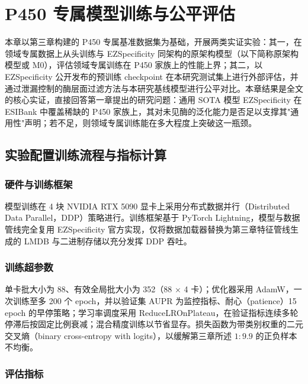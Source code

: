 
\chapter{P450 专属模型训练与公平评估}
\label{cha:training}

本章以第三章构建的 P450 专属基准数据集为基础，开展两类实证实验：其一，在领域专属数据上从头训练与 EZSpecificity 同架构的原架构模型（以下简称原架构模型或 M0），评估领域专属训练在 P450 家族上的性能上界；其二，以 EZSpecificity 公开发布的预训练 checkpoint 在本研究测试集上进行外部评估，并通过泄漏控制的酶层面过滤方法与本研究基线模型进行公平对比。本章结果是全文的核心实证，直接回答第一章提出的研究问题：通用 SOTA 模型 EZSpecificity 在 ESIBank 中覆盖稀缺的 P450 家族上，其对未见酶的泛化能力是否足以支撑其"通用性"声明；若不足，则领域专属训练能在多大程度上突破这一瓶颈。

\section{实验配置训练流程与指标计算}
\label{sec:ch4-config}

\subsection{硬件与训练框架}
\label{subsec:ch4-hw}

模型训练在 4 块 NVIDIA RTX 5090 显卡上采用分布式数据并行（Distributed Data Parallel，DDP）策略进行。训练框架基于 PyTorch Lightning\cite{Lightning2019}，模型与数据管线完全复用 EZSpecificity 官方实现\cite{EZSpec2025}，仅将数据加载器替换为第三章特征管线生成的 LMDB 与二进制存储以充分发挥 DDP 吞吐。

\subsection{训练超参数}
\label{subsec:ch4-hyper}

单卡批大小为 88、有效全局批大小为 352（88 × 4 卡）；优化器采用 AdamW\cite{AdamW2019}，一次训练至多 200 个 epoch，并以验证集 AUPR 为监控指标、耐心（patience）15 epoch 的早停策略；学习率调度采用 ReduceLROnPlateau，在验证指标连续多轮停滞后按固定比例衰减；混合精度训练以节省显存。损失函数为带类别权重的二元交叉熵（binary cross-entropy with logits），以缓解第三章所述 $1:9.9$ 的正负样本不均衡。

\subsection{评估指标}
\label{subsec:ch4-metrics}

